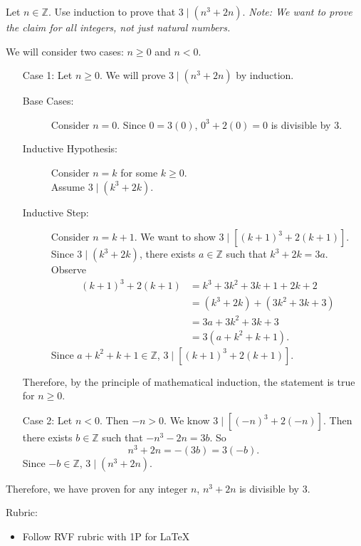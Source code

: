 \documentclass{article}
\newcommand{\Z}{\mathbb{Z}}
\theoremstyle{definition}
\begin{document}
\begin{question}{10}
    Let $n\in \Z$. Use induction to prove that $3 \mid (n^3+2n)$. \textit{Note: We want to prove the claim for all integers, not just natural numbers.}
\end{question}
\begin{solution}
        We will consider two cases: $n\geq 0$ and $n<0$.
    \begin{itemize}
        \item[Case 1:] Let $n\geq 0$. We will prove $3 \mid (n^3+2n)$ by induction.
	\begin{description}
	\item[Base Cases: ] Consider $n=0$. Since $0=3(0)$, $0^3+2(0)=0$ is divisible by 3.
	
	\item[Inductive Hypothesis: ] Consider $n=k$ for some $k\geq 0$.\\ Assume $3 \mid (k^3+2k)$.
	
	\item[Inductive Step: ] Consider $n=k+1$. We want to show $3\mid [(k+1)^3+2(k+1)]$. Since $3 \mid (k^3+2k)$, there exists $a\in \Z$ such that $k^3+2k=3a$. Observe
 \begin{align*}
     (k+1)^3 + 2(k+1) &= k^3+3k^2+3k+1 + 2k +2\\
     &= (k^3+2k) + (3k^2+3k+3)\\
     &= 3a + 3k^2+3k+3\\
     & = 3 (a + k^2+k+1).
 \end{align*}
 Since $a + k^2+k+1\in \Z$, $3\mid [(k+1)^3+2(k+1)]$.
	\end{description}
	Therefore, by the principle of mathematical induction, the statement is true for $n\geq 0$.

 \item[Case 2:] Let $n<0$. Then $-n>0$. We know $3 \mid [(-n)^3+2(-n)]$. Then there exists $b\in \Z$ such that $-n^3-2n=3b$. So 
 \[
 n^3+2n = -(3b) = 3 (-b).
 \]
 Since $-b\in\Z$, $3\mid (n^3+2n)$.

 \end{itemize}

 Therefore, we have proven for any integer $n$, $n^3+2n$ is divisible by 3.
	
{\color{red} Rubric:
\begin{itemize}
\item Follow RVF rubric with 1P for \LaTeX
\end{itemize}}
\end{solution}
\end{document}
